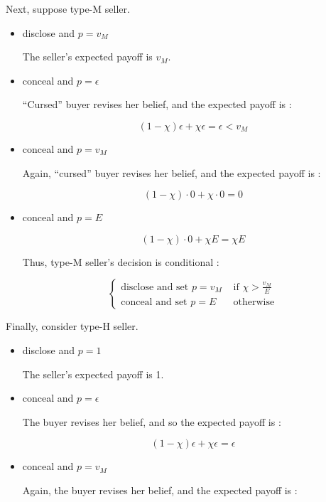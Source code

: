 \documentclass{jsarticle}
\begin{document}
\begin{enumerate}
\begin{enumerate}
 \newpage
 
 Next, suppose type-M seller.
 
  \begin{itemize}
  
  \item disclose and $p = v_M$
  
  The seller's expected payoff is $v_M$.
  
  \item conceal and $p = \epsilon$ 
  
 ``Cursed'' buyer revises her belief, and the expected payoff is :
  
  \[ (1-\chi) \epsilon + \chi \epsilon = \epsilon < v_M \]
  
  \item conceal and $p = v_M$
  
  Again, ``cursed'' buyer revises her belief, and the expected payoff is :
  
  \[ (1 - \chi) \cdot 0 + \chi \cdot 0 = 0 \]
  
  \item conceal and $p = E$
  
  \[ (1 - \chi ) \cdot 0 + \chi E = \chi E \]
  
  Thus, type-M seller's decision is conditional :
  
  \[\begin{cases} 
  \text{disclose and set } p = v_M & \text{ if } \chi > \frac{v_M}{E} \\
  \text{conceal and set } p = E & \text { otherwise}
  \end{cases} \]
    
  \end{itemize}
 
 Finally, consider type-H seller.
 
  \begin{itemize}
  
  \item disclose and $p = 1$
  
  The seller's expected payoff is 1.
  
  \item conceal and $p= \epsilon$
  
  The buyer revises her belief, and so the expected payoff is :
  
  \[ (1 - \chi) \epsilon + \chi \epsilon = \epsilon \]
  
  \item conceal and $p = v_M$
  
  Again, the buyer revises her belief, and the expected payoff is :
  

\end{itemize}
\end{enumerate}
\end{enumerate}
\end{document}
